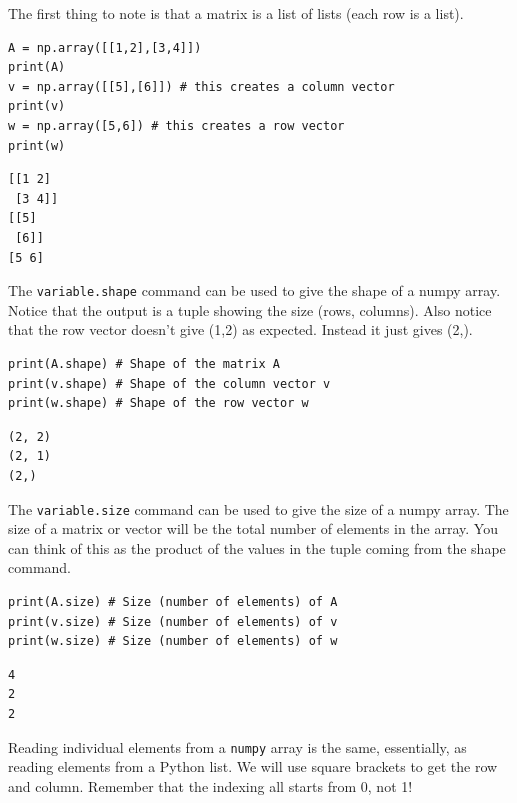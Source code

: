 \begin{example}
    The first thing to note is that a matrix is a list of lists (each row is a list).

\bcode
\begin{lstlisting}
A = np.array([[1,2],[3,4]])
print(A)
v = np.array([[5],[6]]) # this creates a column vector
print(v)
w = np.array([5,6]) # this creates a row vector
print(w)
\end{lstlisting}
\boutput
\begin{lstlisting}
[[1 2]
 [3 4]]
[[5]
 [6]]
[5 6]
\end{lstlisting}
\end{example}

\begin{example}
    The \texttt{variable.shape} command can be used to give the shape of a numpy array.
    Notice that the output is a tuple showing the size (rows, columns).  Also notice that
    the row vector doesn't give (1,2) as expected.  Instead it just gives (2,).  

\bcode
\begin{lstlisting}
print(A.shape) # Shape of the matrix A
print(v.shape) # Shape of the column vector v
print(w.shape) # Shape of the row vector w
\end{lstlisting}
\boutput
\begin{lstlisting}
(2, 2)
(2, 1)
(2,)
\end{lstlisting}
\end{example}

\begin{example}
    The \texttt{variable.size} command can be used to give the size of a numpy array.
    The size of a matrix or vector will be the total number of elements in the array.  You
    can think of this as the product of the values in the tuple coming from the shape
    command.

\bcode
\begin{lstlisting}
print(A.size) # Size (number of elements) of A
print(v.size) # Size (number of elements) of v
print(w.size) # Size (number of elements) of w
\end{lstlisting}
\boutput
\begin{lstlisting}
4
2
2
\end{lstlisting}
    
\end{example}

Reading individual elements from a \texttt{numpy} array is the same, essentially, as
reading elements from a Python list.  We will use square brackets to get the row and
column.  Remember that the indexing all starts from 0, not 1!

